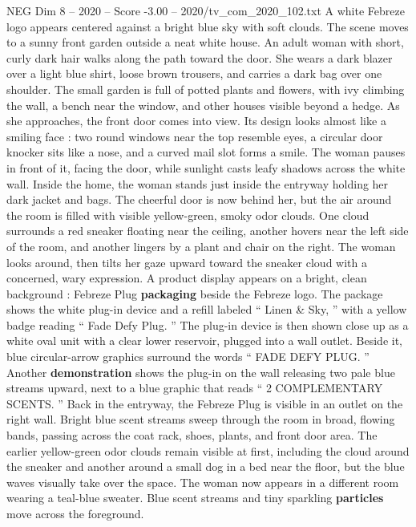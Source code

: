 \begin{textsample}{NEG Dim 8 – 2020 – Score -3.00 – 2020/tv\_com\_2020\_102.txt}  \label{ex:f8_neg_050}
A white Febreze logo appears centered against a bright blue sky with soft clouds.
The scene moves to a sunny front garden outside a neat white house.
An adult woman with short, curly dark hair walks along the path toward the door.
She wears a dark blazer over a light blue shirt, loose brown trousers, and carries a dark bag over one shoulder.
The small garden is full of potted plants and flowers, with ivy climbing the wall, a bench near the window, and other houses visible beyond a hedge.
As she approaches, the front door comes into view.
Its design looks almost like a smiling face : two round windows near the top resemble eyes, a circular door knocker sits like a nose, and a curved mail slot forms a smile.
The woman pauses in front of it, facing the door, while sunlight casts leafy shadows across the white wall.
Inside the home, the woman stands just inside the entryway holding her dark jacket and bags.
The cheerful door is now behind her, but the air around the room is filled with visible yellow-green, smoky odor clouds.
One cloud surrounds a red sneaker floating near the ceiling, another hovers near the left side of the room, and another lingers by a plant and chair on the right.
The woman looks around, then tilts her gaze upward toward the sneaker cloud with a concerned, wary expression.
A product display appears on a bright, clean background : Febreze Plug \textbf{packaging} beside the Febreze logo.
The package shows the white plug-in device and a refill labeled “ Linen \& Sky, ” with a yellow badge reading “ Fade Defy Plug. ” The plug-in device is then shown close up as a white oval unit with a clear lower reservoir, plugged into a wall outlet.
Beside it, blue circular-arrow graphics surround the words “ FADE DEFY PLUG. ” Another \textbf{demonstration} shows the plug-in on the wall releasing two pale blue streams upward, next to a blue graphic that reads “ 2 COMPLEMENTARY SCENTS. ” Back in the entryway, the Febreze Plug is visible in an outlet on the right wall.
Bright blue scent streams sweep through the room in broad, flowing bands, passing across the coat rack, shoes, plants, and front door area.
The earlier yellow-green odor clouds remain visible at first, including the cloud around the sneaker and another around a small dog in a bed near the floor, but the blue waves visually take over the space.
The woman now appears in a different room wearing a teal-blue sweater.
Blue scent streams and tiny sparkling \textbf{particles} move across the foreground.

\end{textsample}
